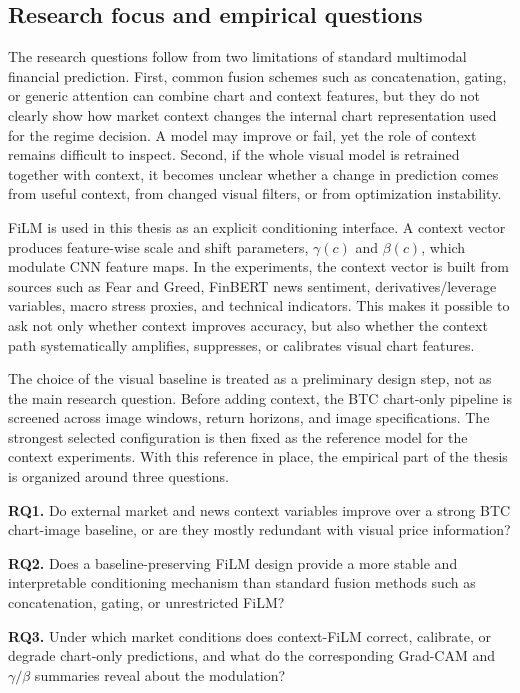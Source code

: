 \documentclass[14pt,a4paper]{extarticle}
\begin{document}
\subsection{Research focus and empirical questions}

The research questions follow from two limitations of standard multimodal financial prediction. First, common fusion schemes such as concatenation, gating, or generic attention can combine chart and context features, but they do not clearly show how market context changes the internal chart representation used for the regime decision. A model may improve or fail, yet the role of context remains difficult to inspect. Second, if the whole visual model is retrained together with context, it becomes unclear whether a change in prediction comes from useful context, from changed visual filters, or from optimization instability.

FiLM is used in this thesis as an explicit conditioning interface. A context vector produces feature-wise scale and shift parameters, $\gamma(c)$ and $\beta(c)$, which modulate CNN feature maps. In the experiments, the context vector is built from sources such as Fear and Greed, FinBERT news sentiment, derivatives/leverage variables, macro stress proxies, and technical indicators. This makes it possible to ask not only whether context improves accuracy, but also whether the context path systematically amplifies, suppresses, or calibrates visual chart features.

The choice of the visual baseline is treated as a preliminary design step, not as the main research question. Before adding context, the BTC chart-only pipeline is screened across image windows, return horizons, and image specifications. The strongest selected configuration is then fixed as the reference model for the context experiments. With this reference in place, the empirical part of the thesis is organized around three questions.

\textbf{RQ1.} Do external market and news context variables improve over a strong BTC chart-image baseline, or are they mostly redundant with visual price information?

\textbf{RQ2.} Does a baseline-preserving FiLM design provide a more stable and interpretable conditioning mechanism than standard fusion methods such as concatenation, gating, or unrestricted FiLM?

\textbf{RQ3.} Under which market conditions does context-FiLM correct, calibrate, or degrade chart-only predictions, and what do the corresponding Grad-CAM and $\gamma/\beta$ summaries reveal about the modulation?
\end{document}
